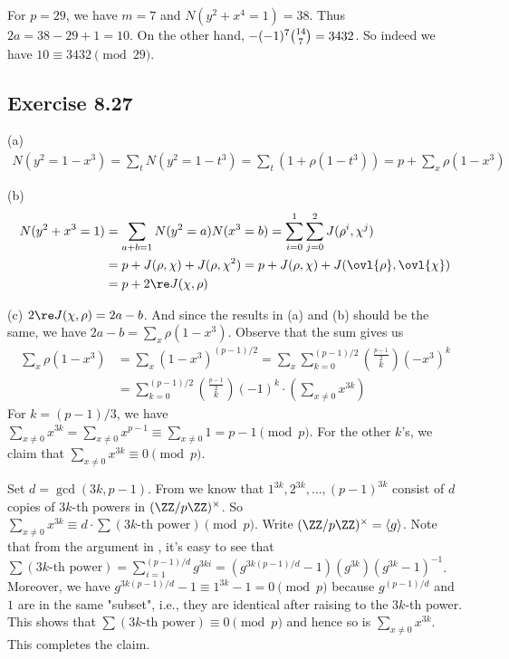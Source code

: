 \documentclass[../Chapter.tex]{subfiles}
\begin{document}
For $p=29$, we have $m=7$ and $N(y^2+x^4=1)=38$. Thus $2a=38-29+1=10$. On the other hand, $-(-1)^7\tbinom{14}{7}=3432$. So indeed we have $10\equiv3432\pmod{29}$.

\subsection*{Exercise 8.27}

(a) \begin{align*}
N(y^2=1-x^3) = \sum_t N(y^2=1-t^3) = \sum _t (1+\rho(1-t^3)) = p+\sum_x \rho(1-x^3)
\end{align*}

(b) \begin{align*}
N(y^2+x^3=1) &= \sum_{a+b=1} N(y^2=a)N(x^3=b) = \sum_{i=0}^1\sum_{j=0}^2 J(\rho^i,\chi^j) \\
&= p+J(\rho,\chi)+J(\rho,\chi^2) = p+J(\rho,\chi)+J(\ovl{\rho},\ovl{\chi}) \\
&= p+2\re J(\chi,\rho)
\end{align*}

(c) $2\re J(\chi,\rho)=2a-b$. And since the results in (a) and (b) should be the same, we have $2a-b=\sum_x \rho(1-x^3)$. Observe that the sum gives us
\begin{align*}
\sum_x \rho(1-x^3) &= \sum_x (1-x^3)^{(p-1)/2} = \sum_x \sum_{k=0}^{(p-1)/2} \binom{\frac{p-1}{2}}{k}(-x^3)^k \\
&= \sum_{k=0}^{(p-1)/2}\binom{\frac{p-1}{2}}{k}(-1)^k\cdot\left(\sum_{x\neq0} x^{3k}\right)
\end{align*}
For $k=(p-1)/3$, we have $\sum_{x\neq0} x^{3k} = \sum_{x\neq0} x^{p-1} \equiv\sum_{x\neq0} 1 = p-1 \pmod{p}$. For the other $k$'s, we claim that $\sum_{x\neq0} x^{3k}\equiv0\pmod{p}$.

Set $d=\gcd(3k,p-1)$. From  we know that $1^{3k},2^{3k},\ldots,(p-1)^{3k}$ consist of $d$ copies of $3k$-th powers in $(\ZZ/p\ZZ)^\times$. So $\sum_{x\neq0} x^{3k}\equiv d\cdot\sum (3k\text{-th power}) \pmod{p}$. Write $(\ZZ/p\ZZ)^\times=\langle g\rangle$. Note that from the argument in , it's easy to see that $\sum (3k\text{-th power}) = \sum_{i=1}^{(p-1)/d} g^{3ki} = (g^{3k(p-1)/d}-1)(g^{3k})(g^{3k}-1)^{-1}$. Moreover, we have $g^{3k(p-1)/d}-1\equiv 1^{3k}-1=0\pmod{p}$ because $g^{(p-1)/d}$ and $1$ are in the same "subset", i.e., they are identical after raising to the $3k$-th power. This shows that $\sum (3k\text{-th power}) \equiv0\pmod{p}$ and hence so is $\sum_{x\neq0} x^{3k}$. This completes the claim.
\end{document}
